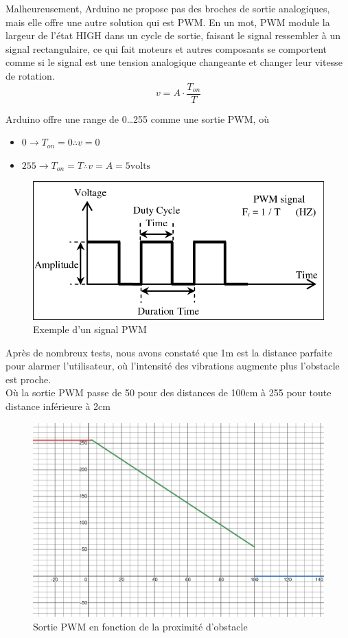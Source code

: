 Malheureusement, Arduino ne propose pas des broches de sortie analogiques, mais elle offre une autre solution qui est \acrshort{PWM}.
En un mot, \acrshort{PWM} module la largeur de l’état HIGH dans un cycle de sortie, faisant le signal ressembler à un signal rectangulaire, ce qui fait moteurs et autres composants se comportent comme si le signal est une tension analogique changeante et changer leur vitesse de rotation.
\[v =  A \cdot \frac{T_{on}}{T} \]

Arduino offre une range de 0\dots 255 comme une sortie \acrshort{PWM}, où 
\begin{itemize}
    \item \(0 \rightarrow T_{on} = 0 \therefore v = 0\)
    \item \(255 \rightarrow T_{on} = T \therefore v = A = 5 \text{volts}\)
\end{itemize}

\begin{figure}[!htbp]
    \centering
    \includegraphics[width=.7\linewidth]{assets/PWM-signal-with-its-two-basic-time-periods.png}
    \caption{Exemple d'un signal \acrshort{PWM}}
\end{figure}

\FloatBarrier

Après de nombreux tests, nous avons constaté que 1m est la distance parfaite pour alarmer l’utilisateur, où l’intensité des vibrations augmente plus l’obstacle est proche. \\
Où la sortie \acrshort{PWM} passe de 50 pour des distances de 100cm à 255 pour toute distance inférieure à 2cm

\begin{figure}[!htbp]
    \centering
    \includegraphics[width=.9\linewidth]{assets/HC-SR04/fonction de vibration.png}
    \caption{Sortie \acrshort{PWM} en fonction de la proximité d'obstacle}
\end{figure}

